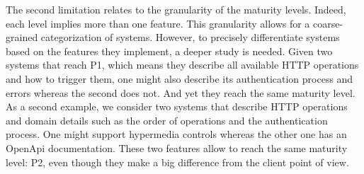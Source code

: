 The second limitation relates to the granularity of the maturity levels. Indeed, each level implies more than one feature. This granularity allows for a coarse-grained categorization of systems. However, to precisely differentiate systems based on the features they implement, a deeper study is needed. Given two systems that reach P1, which means they describe all available HTTP operations and how to trigger them, one might also describe its authentication process and errors whereas the second does not. And yet they reach the same maturity level. As a second example, we consider two systems that describe HTTP operations and domain details such as the order of operations and the authentication process. One might support hypermedia controls whereas the other one has an OpenApi documentation. These two features allow to reach the same maturity level: P2, even though they make a big difference from the client point of view.
